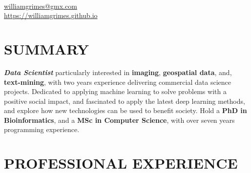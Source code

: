 \documentclass[margin,line]{resume}
\begin{document}
{
    \hfill                 \ \Mobilefone                                               \vspace{0mm}\\\vspace{0mm}%
    \hfill \href{mailto:williamgrimes@gmx.com}{williamgrimes@gmx.com} \ \Letter        \vspace{0mm}\\\vspace{0mm}%
    \hfill \url{https://williamgrimes.github.io} \                      \ComputerMouse \vspace{0mm}\\\vspace{-10mm}%
}

\begin{resume}

    \vspace{-3mm}

    \section{\mysidestyle \textbf{\large{S}\small{UMMARY}}}

    \textbf{\textsl{Data Scientist}} particularly interested in \textbf{imaging}, \textbf{geospatial data}, and, \textbf{text-mining}, with two years experience delivering commercial data science projects.  Dedicated to applying machine learning to solve problems with a positive social impact, and fascinated to apply the latest deep learning methods, and explore how new technologies can be used to benefit society.  Hold a \textbf{PhD in Bioinformatics}, and a \textbf{MSc in Computer Science}, with over seven years programming experience.  

    \vspace{-1mm}

\sectionline

    \section{\mysidestyle \textbf{\large{P}\small{ROFESSIONAL} \large{E}\small{XPERIENCE}}}


\end{resume}
\end{document}
